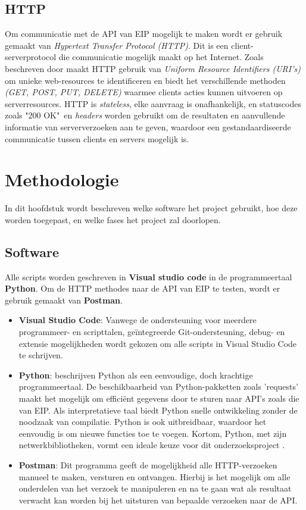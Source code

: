\documentclass{hogent-article}
\begin{document}
\subsection{HTTP}
Om communicatie met de API van EIP mogelijk te maken wordt er gebruik gemaakt van \textit{Hypertext Transfer Protocol (HTTP)}. Dit is een client-serverprotocol die communicatie mogelijk maakt op het Internet. Zoals beschreven door \textcite{Fielding2014} maakt HTTP gebruik van \textit{Uniform Resource Identifiers (URI's)} om unieke web-resources te identificeren en biedt het verschillende methoden \textit{(GET, POST, PUT, DELETE)} waarmee clients acties kunnen uitvoeren op serverresources. HTTP is \textit{stateless}, elke aanvraag is onafhankelijk, en statuscodes zoals "200 OK"\ en \textit{headers} worden gebruikt om de resultaten en aanvullende informatie van serververzoeken aan te geven, waardoor een gestandaardiseerde communicatie tussen clients en servers mogelijk is.

\section{Methodologie}
\label{sec:methodologie}
In dit hoofdstuk wordt beschreven welke software het project gebruikt, hoe deze worden toegepast, en welke fases het project zal doorlopen.

\subsection{Software}
Alle scripts worden geschreven in \textbf{Visual studio code} in de programmeertaal \textbf{Python}.
Om de HTTP methodes naar de API van EIP te testen, wordt er gebruik gemaakt van \textbf{Postman}.
\begin{itemize}
    \item \textbf{Visual Studio Code}: Vanwege de ondersteuning voor meerdere programmeer- en scripttalen, geïntegreerde Git-ondersteuning, debug- en extensie mogelijkheden wordt gekozen om alle scripts in Visual Studio Code te schrijven.
    \item \textbf{Python}: \textcite{VanRossum2011} beschrijven Python als een eenvoudige, doch krachtige programmeertaal. De beschikbaarheid van Python-pakketten zoals ’requests’ maakt het mogelijk om efficiënt gegevens door te sturen naar API’s zoals die van EIP. Als interpretatieve taal biedt Python snelle ontwikkeling zonder de noodzaak van compilatie. Python is ook uitbreidbaar, waardoor het eenvoudig is om nieuwe functies toe te voegen. Kortom, Python, met zijn netwerkbibliotheken, vormt een ideale keuze voor dit onderzoeksproject \autocite{VanRossum2011}.
    \item \textbf{Postman}: Dit programma geeft de mogelijkheid alle HTTP-verzoeken manueel te maken, versturen en ontvangen. Hierbij is het mogelijk om alle onderdelen van het verzoek te manipuleren en na te gaan wat als resultaat verwacht kan worden bij het uitsturen van bepaalde verzoeken naar de API.
\end{itemize}
\end{document}

